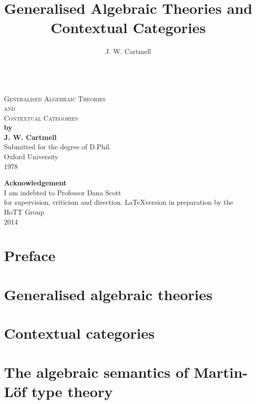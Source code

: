 \documentclass[11pt,a4]{amsbook}
\begin{document}
\frontmatter


\title{Generalised Algebraic Theories and Contextual Categories}

\author{J. W. Cartmell}

\thispagestyle{empty}

\begin{center}
  ~ \\
  \vspace{3cm}
  {\Large\textsc{Generalised Algebraic Theories  \\ and \\ Contextual Categories}}\\
  \vspace{3cm}
  {\large\textbf{by \\ J. W. Cartmell}}\\
  \vspace{7cm}
  Submitted for the degree of D.Phil.\\ Oxford University \\ 1978 \\
\end{center}
 
\newpage

\thispagestyle{empty}
\begin{center}
\textbf{Acknowledgement} \\
I am indebted to Professor Dana Scott \\ for supervision, criticism and direction.
\vspace{15cm}
\LaTeX version in preparation by the HoTT Group \\ 2014
\end{center}

\clearpage

\tableofcontents

\chapter*{Preface}
\label{ch:preface}


\mainmatter


\chapter{Generalised algebraic theories}
\label{ch:gats}


\chapter{Contextual categories}
\label{ch:cxl-cats}


\chapter{The algebraic semantics of Martin-Löf type theory}
\label{ch:mltt}


\backmatter




\end{document}
